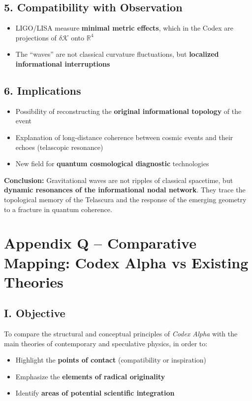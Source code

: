 \documentclass[12pt]{article}
\begin{document}
\subsection*{5. Compatibility with Observation}
\begin{itemize}
    \item LIGO/LISA measure \textbf{minimal metric effects}, which in the Codex are projections of $\delta \mathcal{K}$ onto $\mathbb{R}^4$
    \item The “waves” are not classical curvature fluctuations, but \textbf{localized informational interruptions}
\end{itemize}

\subsection*{6. Implications}
\begin{itemize}
    \item Possibility of reconstructing the \textbf{original informational topology} of the event
    \item Explanation of long-distance coherence between cosmic events and their echoes (telascopic resonance)
    \item New field for \textbf{quantum cosmological diagnostic} technologies
\end{itemize}

\textbf{Conclusion:} Gravitational waves are not ripples of classical spacetime, but \textbf{dynamic resonances of the informational nodal network}. They trace the topological memory of the Telascura and the response of the emerging geometry to a fracture in quantum coherence.

\section*{Appendix Q – Comparative Mapping: Codex Alpha vs Existing Theories}

\subsection*{I. Objective}
To compare the structural and conceptual principles of \textit{Codex Alpha} with the main theories of contemporary and speculative physics, in order to:
\begin{itemize}
    \item Highlight the \textbf{points of contact} (compatibility or inspiration)
    \item Emphasize the \textbf{elements of radical originality}
    \item Identify \textbf{areas of potential scientific integration}
\end{itemize}
\end{document}
